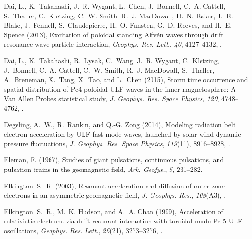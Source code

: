 \documentclass[draft,linenumbers]{agujournal}
\begin{document}
\begin{thebibliography}{50}
Dai, L., K.~Takahashi, J.~R. Wygant, L.~Chen, J.~Bonnell, C.~A. Cattell,
  S.~Thaller, C.~Kletzing, C.~W. Smith, R.~J. MacDowall, D.~N. Baker, J.~B.
  Blake, J.~Fennell, S.~Claudepierre, H.~O. Funsten, G.~D. Reeves, and H.~E.
  Spence (2013), Excitation of poloidal standing {Alfv{\'e}n} waves through
  drift resonance wave-particle interaction, \textit{Geophys. Res. Lett.},
  \textit{40}, 4127--4132, .

Dai, L., K.~Takahashi, R.~Lysak, C.~Wang, J.~R. Wygant, C.~Kletzing,
  J.~Bonnell, C.~A. Cattell, C.~W. Smith, R.~J. MacDowall, S.~Thaller,
  A.~Breneman, X.~Tang, X.~Tao, and L.~Chen (2015), Storm time occurrence and
  spatial distribution of {Pc4} poloidal {ULF} waves in the inner
  magnetosphere: A {Van Allen Probes} statistical study, \textit{J. Geophys.
  Res. Space Physics}, \textit{120}, 4748--4762, .

Degeling, A.~W., R.~Rankin, and Q.-G. Zong (2014), Modeling radiation belt
  electron acceleration by {ULF} fast mode waves, launched by solar wind
  dynamic pressure fluctuations, \textit{J. Geophys. Res. Space Physics},
  \textit{119}(11), 8916--8928, .

Eleman, F. (1967), Studies of giant pulsations, continuous pulsations, and
  pulsation trains in the geomagnetic field, \textit{Ark. Geofys.}, \textit{5},
  231--282.

Elkington, S.~R. (2003), Resonant acceleration and diffusion of outer zone
  electrons in an asymmetric geomagnetic field, \textit{J. Geophys. Res.},
  \textit{108}(A3), .

Elkington, S.~R., M.~K. Hudson, and A.~A. Chan (1999), Acceleration of
  relativistic electrons via drift-resonant interaction with toroidal-mode
  {Pc-5} {ULF} oscillations, \textit{Geophys. Res. Lett.}, \textit{26}(21),
  3273--3276, .


\end{thebibliography}
\end{document}

